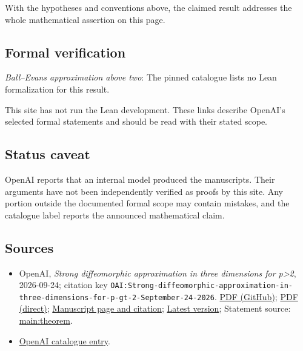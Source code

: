 \documentclass[11pt]{article}
\begin{document}
With the hypotheses and conventions above, the claimed result addresses the whole mathematical assertion on this page.

\subsection{Formal verification}
\textit{Ball--Evans approximation above two}: The pinned catalogue lists no Lean formalization for this result.

This site has not run the Lean development. These links describe OpenAI’s selected formal statements and should be read with their stated scope.

\subsection{Status caveat}
OpenAI reports that an internal model produced the manuscripts. Their arguments have not been independently verified as proofs by this site. Any portion outside the documented formal scope may contain mistakes, and the catalogue label reports the announced mathematical claim.

\subsection{Sources}
\begin{itemize}
\item OpenAI, \emph{Strong diffeomorphic approximation in three dimensions for p>2}, 2026-09-24; citation key \texttt{OAI:Strong-diffeomorphic-approximation-in-three-dimensions-for-p-gt-2-September-24-2026}. \href{https://github.com/openai/math/blob/adc7f1241b42e322a6451854ab7e4b4c146bf78a/preprints/Strong-diffeomorphic-approximation-in-three-dimensions-for-p-gt-2-September-24-2026/main.pdf}{PDF (GitHub)}; \href{https://github.com/openai/math/raw/adc7f1241b42e322a6451854ab7e4b4c146bf78a/preprints/Strong-diffeomorphic-approximation-in-three-dimensions-for-p-gt-2-September-24-2026/main.pdf}{PDF (direct)}; \href{https://github.com/openai/math/blob/adc7f1241b42e322a6451854ab7e4b4c146bf78a/preprints/Strong-diffeomorphic-approximation-in-three-dimensions-for-p-gt-2-September-24-2026/README.md}{Manuscript page and citation}; \href{https://github.com/openai/math/blob/main/preprints/Strong-diffeomorphic-approximation-in-three-dimensions-for-p-gt-2-September-24-2026/main.pdf}{Latest version}; Statement source: \href{https://github.com/openai/math/blob/adc7f1241b42e322a6451854ab7e4b4c146bf78a/preprints/Strong-diffeomorphic-approximation-in-three-dimensions-for-p-gt-2-September-24-2026/build/sections/01-introduction.tex\#L25}{main:theorem}.
\item \href{https://github.com/openai/math/blob/adc7f1241b42e322a6451854ab7e4b4c146bf78a/CONTENTS.md}{OpenAI catalogue entry}.
\end{itemize}
\end{document}
